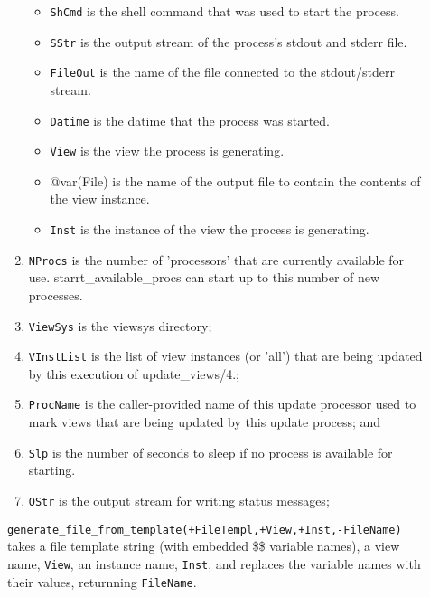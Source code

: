 \begin{description}
\begin{enumerate}
\begin{itemize}
\item {\tt ShCmd} is the shell command that was used to start the process.

\item {\tt SStr} is the output stream of the process's stdout and stderr file.

\item {\tt FileOut} is the name of the file connected to the stdout/stderr stream.

\item {\tt Datime} is the datime that the process was started.

\item {\tt View} is the view the process is generating.

\item @var(File) is the name of the output file to contain the
contents of the view instance.

\item {\tt Inst} is the instance of the view the process is generating.

\end{itemize}

\item {\tt NProcs} is the number of 'processors' that are currently
available for use.  starrt\_available\_procs can start up to this number
of new processes.

\item {\tt ViewSys} is the viewsys directory;

\item {\tt VInstList} is the list of view instances (or 'all') that are
being updated by this execution of update\_views/4.;

\item {\tt ProcName} is the caller-provided name of this update
processor used to mark views that are being updated by this update
process; and

\item {\tt Slp} is the number of seconds to sleep if no process is
available for starting.

\item {\tt OStr} is the output stream for writing status messages;

\end{enumerate}

%
{\tt generate\_file\_from\_template(+FileTempl,+View,+Inst,-FileName)}
takes a file template string (with embedded \$\$ variable names), a view
name, {\tt View}, an instance name, {\tt Inst}, and replaces the
variable names with their values, returnning {\tt FileName}.


\end{description}
